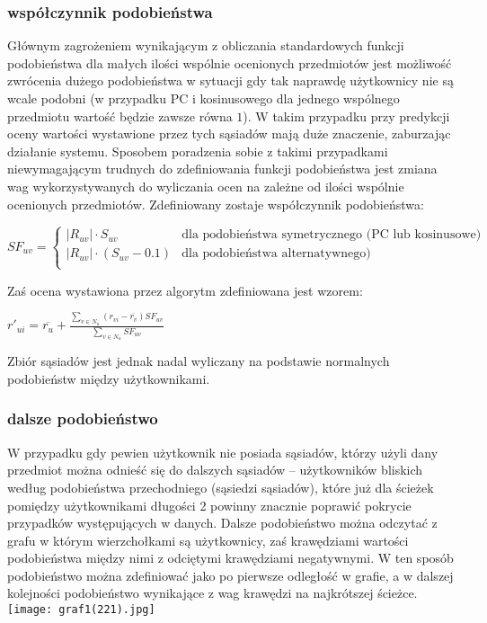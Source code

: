 \documentclass{pracamgr}
\begin{document}
    \subsubsection{współczynnik podobieństwa}
     Głównym zagrożeniem wynikającym z obliczania standardowych funkcji podobieństwa dla małych ilości wspólnie ocenionych przedmiotów jest możliwość
     zwrócenia dużego podobieństwa w sytuacji gdy tak naprawdę użytkownicy nie są wcale podobni
     (w przypadku PC i kosinusowego dla jednego wspólnego przedmiotu wartość będzie zawsze równa $1$).
     W takim przypadku przy predykcji oceny wartości wystawione przez tych sąsiadów mają duże znaczenie, zaburzając działanie systemu.
     Sposobem poradzenia sobie z takimi przypadkami niewymagającym trudnych do zdefiniowania funkcji podobieństwa jest zmiana wag
     wykorzystywanych do wyliczania ocen na zależne od ilości wspólnie ocenionych przedmiotów.
     Zdefiniowany zostaje współczynnik podobieństwa:
     \begin{center}
      $SF_{uv}=\left\{\begin{array}{cc}
       |R_{uv}|\cdot S_{uv}&\text{dla podobieństwa symetrycznego (PC lub kosinusowe)}\\
       |R_{uv}|\cdot(S_{uv}-0.1)&\text{dla podobieństwa alternatywnego)}\\
      \end{array}\right.$
     \end{center}
     Zaś ocena wystawiona przez algorytm zdefiniowana jest wzorem:
     \begin{center}
     $r'_{ui}=\overline{r_{u}}+\frac{\sum\limits_{v\in N_u}(r_{vi}-\overline{r_v})SF_{uv}}{\sum\limits_{v\in N_u}SF_{uv}}$
     \end{center}
     Zbiór sąsiadów jest jednak nadal wyliczany na podstawie normalnych podobieństw między użytkownikami.
    \subsubsection{dalsze podobieństwo}
     W przypadku gdy pewien użytkownik nie posiada sąsiadów, którzy użyli dany przedmiot %
     można odnieść się do dalszych sąsiadów -- użytkowników bliskich według podobieństwa przechodniego (sąsiedzi sąsiadów),
     które już dla ścieżek pomiędzy użytkownikami długości 2 powinny znacznie poprawić pokrycie przypadków występujących w danych.%
     Dalsze podobieństwo można odczytać z grafu w którym wierzchołkami są użytkownicy, zaś krawędziami wartości podobieństwa między nimi z odciętymi krawędziami
     negatywnymi. W ten sposób podobieństwo można zdefiniować jako po pierwsze odległość w grafie, a w dalszej kolejności podobieństwo wynikające z wag krawędzi
     na najkrótszej ścieżce.\newline
     \texttt{[image: graf1(221).jpg]}\newline
\end{document}
